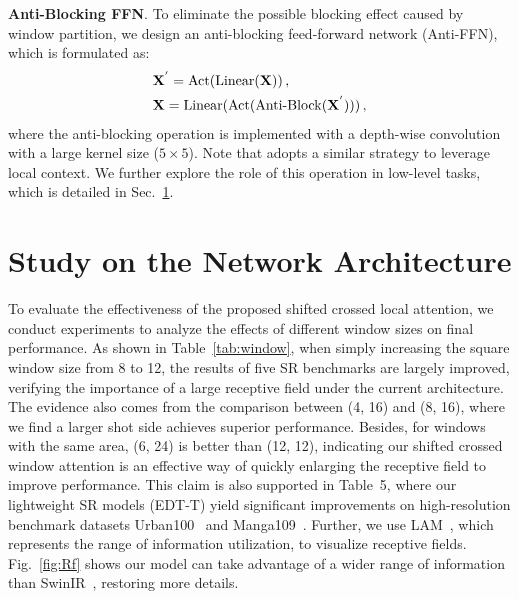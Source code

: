 \documentclass[runningheads]{llncs}
\begin{document}
	
\noindent\textbf{Anti-Blocking FFN}. 
	To eliminate the possible blocking effect caused by window partition, we design an anti-blocking feed-forward network (Anti-FFN), which is formulated as:
	\begin{align}
	&\mathbf{X}^{'} = {\rm Act}( {\rm Linear}(\mathbf{X}) ) \,, \\
	&\mathbf{X} = {\rm Linear}({\rm Act}( {\rm Anti\text{-}Block}(\mathbf{X}^{'})) ) \,,
	\end{align}
where the anti-blocking operation is implemented with a depth-wise convolution with a large kernel size ($5 \times 5$). Note that \cite{wang2021uformer} adopts a similar strategy to leverage local context. We further explore the role of this operation in low-level tasks, which is detailed in Sec.~\ref{sec:abl}.
	\vspace{-0.05in}


	\section{Study on the Network Architecture}
	\label{sec:abl}
	
	 To evaluate the effectiveness of the proposed shifted crossed local attention, we conduct experiments to analyze the effects of different window sizes on final performance. As shown in Table~\ref{tab:window}, when simply increasing the square window size from 8 to 12, the results of five SR benchmarks are largely improved, verifying the importance of a large receptive field under the current architecture. The evidence also comes from the comparison between (4, 16) and (8, 16), where we find a larger shot side achieves superior performance. Besides, for windows with the same area, (6, 24) is better than (12, 12), indicating our shifted crossed window attention is an effective way of quickly enlarging the receptive field to improve performance. This claim is also supported in Table~{5}, where our lightweight SR models (EDT-T) yield significant improvements on high-resolution benchmark datasets Urban100~\cite{huang2015single} and Manga109~\cite{matsui2017sketch}. Further, we use LAM~\cite{gu2021interpreting}, which represents the range of information utilization, to visualize receptive fields. Fig.~\ref{fig:Rf} shows our model can take advantage of a wider range of information than SwinIR~\cite{liang2021swinir}, restoring more details.
	
\end{document}
